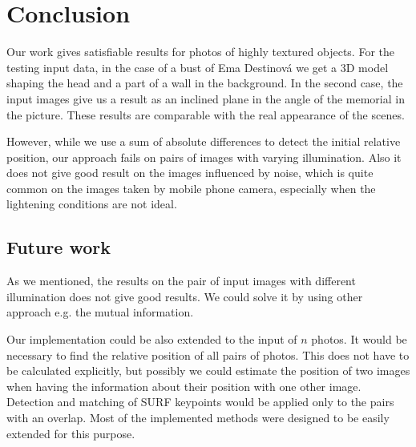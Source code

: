 \chapter*{Conclusion}

Our work gives satisfiable results for photos of highly textured objects.
For the testing input data, in the case of a bust of Ema Destinová we get a 3D model shaping the head and a part of a wall in the background.
In the second case, the input images give us a result as an inclined plane in the angle of the memorial in the picture.
These results are comparable with the real appearance of the scenes.

However, while we use a sum of absolute differences to detect the initial relative position, our approach fails on pairs of images with varying illumination.
Also it does not give good result on the images influenced by noise, which is quite common on the images taken by mobile phone camera, 
especially when the lightening conditions are not ideal.


\section{Future work}
As we mentioned, the results on the pair of input images with different illumination does not give good results.
We could solve it by using other approach e.g. the mutual information.

Our implementation could be also extended to the input of $n$ photos. 
It would be necessary to find the relative position of all pairs of photos.
This does not have to be calculated explicitly, but possibly we could estimate the position of two images when having the information about their position with one other image.
Detection and matching of SURF keypoints would be applied only to the pairs with an overlap.
Most of the implemented methods were designed to be easily extended for this purpose.
